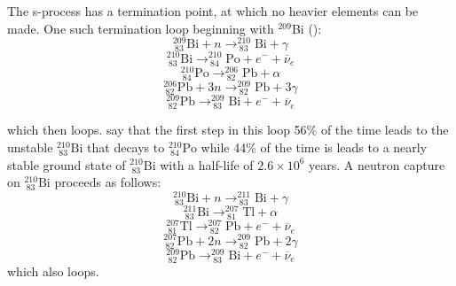 The s-process has a termination point, at which no heavier elements
can be made.  One such termination loop beginning with $^{209}$Bi
(\citealt{claytonetal1961}):
\begin{equation*}
^{209}_{\ 83}\textrm{Bi} + n  \rightarrow ^{210}_{\ 83}\textrm{Bi} +
\gamma 
\end{equation*}
\begin{equation*}
^{210}_{\ 83}\textrm{Bi}   \rightarrow ^{210}_{\ 84}\textrm{Po} +
e^- + \overline{\nu}_e 
\end{equation*}
\begin{equation*}
^{210}_{\ 84}\textrm{Po}   \rightarrow ^{206}_{\ 82}\textrm{Pb} +
\alpha 
\end{equation*}
\begin{equation*}
^{206}_{\ 82}\textrm{Pb} + 3n  \rightarrow ^{209}_{\ 82}\textrm{Pb} +
3\gamma 
\end{equation*}
\begin{equation}
\label{eq:firsttermination}
^{209}_{\ 82}\textrm{Pb}  \rightarrow ^{209}_{\ 83}\textrm{Bi} + e^-
+ \overline{\nu}_e
\end{equation}

which then loops.  \cite{claytonetal1961} say that the first step in this loop 56\% of
the time leads to the unstable $^{210}_{\ 83}\textrm{Bi}$ that decays
to $^{210}_{\ 84}\textrm{Po}$ while 44\% of the time is leads to a
nearly stable ground state of $^{210}_{\ 83}\textrm{Bi}$ with a
half-life of $2.6 \times 10^6$ years.  A neutron capture
on $^{210}_{\ 83}\textrm{Bi}$ proceeds as follows:
\begin{equation*}
^{210}_{\ 83}\textrm{Bi} + n  \rightarrow ^{211}_{\ 83}\textrm{Bi} +
\gamma
\end{equation*}
\begin{equation*}
^{211}_{\ 83}\textrm{Bi}  \rightarrow ^{207}_{\ 81}\textrm{Tl} + \alpha
\end{equation*}
\begin{equation*}
 ^{207}_{\ 81}\textrm{Tl}  \rightarrow  ^{207}_{\ 82}\textrm{Pb} + e^-
 + \overline{\nu}_e
\end{equation*}
\begin{equation*}
^{207}_{\ 82}\textrm{Pb} + 2n  \rightarrow ^{209}_{\ 82}\textrm{Pb} +
2\gamma
\end{equation*}
\begin{equation}
\label{eq:secondtermination}
^{209}_{\ 82}\textrm{Pb}  \rightarrow ^{209}_{\ 83}\textrm{Bi} + e^- + \overline{\nu}_e
\end{equation}
which also loops.

